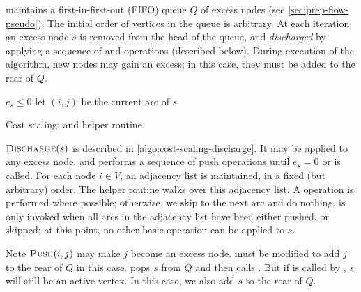  maintains a first-in-first-out (FIFO) queue $Q$ of excess nodes (see \cref{sec:prep-flow-pseudo}). The initial order of vertices in the queue is arbitrary. At each iteration, an excess node $s$ is removed from the head of the queue, and \emph{discharged} by applying a sequence of  and  operations (described below). During execution of the algorithm, new nodes may gain an excess; in this case, they must be added to the rear of $Q$.

\begin{algorithm}
\begin{algorithmic}[1]
        \Repeat
            \State {}
        \Until $e_s \leq 0$
    \EndFunction
    \setcounter{ALG@line}{0}
    \Statex
        \State let $(i,j)$ be the current arc of $s$
         
        \Else
                \State {}
            \Else
            \EndIf
        \EndIf
    \EndFunction
\end{algorithmic}
\caption{Cost scaling:  and helper routine }
\label{algo:cost-scaling-discharge}
\end{algorithm}

$\textproc{Discharge}(s)$ is described in \cref{algo:cost-scaling-discharge}. It may be applied to any excess node, and performs a sequence of push operations until $e_s = 0$ or  is called. For each node $i \in V$, an adjacency list is maintained, in a fixed (but arbitrary) order. The helper routine  walks over this adjacency list. A  operation is performed where possible; otherwise, we skip to the next arc and do nothing.  is only invoked when all arcs in the adjacency list have been either pushed, or skipped; at this point, no other basic operation can be applied to $s$.

Note $\textproc{Push}(i,j)$ may make $j$ become an excess node.  must be modified to add $j$ to the rear of $Q$ in this case.  pops $s$ from $Q$ and then calls . But if  is called by , $s$ will still be an active vertex. In this case, we also add $s$ to the rear of $Q$\footnotemark.\\

